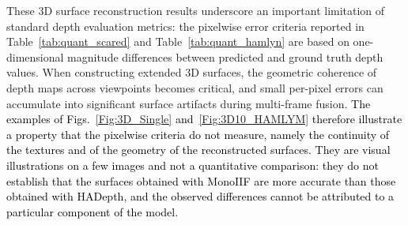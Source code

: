 \documentclass[a4paper,fleqn]{cas-dc}
\begin{document}
These 3D surface reconstruction results underscore an important limitation of standard depth evaluation metrics: the pixelwise error criteria reported in Table~\ref{tab:quant_scared} and Table~\ref{tab:quant_hamlyn} are based on one-dimensional magnitude differences between predicted and ground truth depth values. 
When constructing extended 3D surfaces, the geometric coherence of depth maps across viewpoints becomes critical, and small per-pixel errors can accumulate into significant surface artifacts during multi-frame fusion. \textcolor{black}{The examples of Figs.~\ref{Fig:3D_Single} and~\ref{Fig:3D10_HAMLYM} therefore illustrate a property that the pixelwise criteria do not measure, namely the continuity of the textures and of the geometry of the reconstructed surfaces. They are visual illustrations on a few images and not a quantitative comparison: they do not establish that the surfaces obtained with MonoIIF are more accurate than those obtained with HADepth, and the observed differences cannot be attributed to a particular component of the model.}
%
\end{document}
